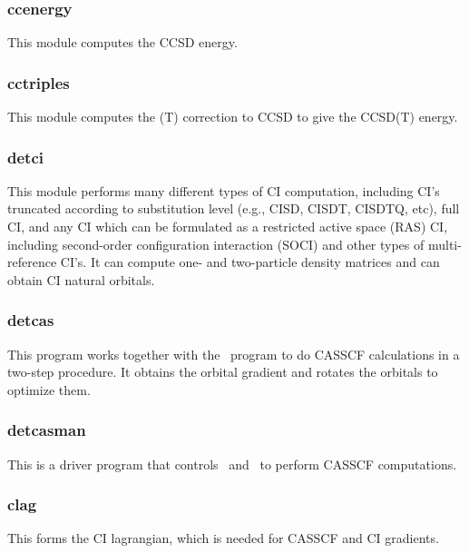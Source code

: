 \subsubsection{ccenergy}
This module computes the CCSD energy.

\subsubsection{cctriples}
This module computes the (T) correction to CCSD to give the CCSD(T)
energy.

\subsubsection{detci}
This module performs many different types of CI computation, including
CI's truncated according to substitution level (e.g., CISD, CISDT,
CISDTQ, etc), full CI, and any CI which can be formulated as a
restricted active space (RAS) CI, including second-order configuration
interaction (SOCI) and other types of multi-reference CI's.  It can
compute one- and two-particle density matrices and can obtain CI
natural orbitals.

\subsubsection{detcas}
This program works together with the \PSIdetci\ program to do CASSCF
calculations in a two-step procedure.  It obtains the orbital gradient
and rotates the orbitals to optimize them.

\subsubsection{detcasman}
This is a driver program that controls \PSIdetci\ and \PSIdetcas\ to
perform CASSCF computations.

\subsubsection{clag}
This forms the CI lagrangian, which is needed for CASSCF and CI gradients.
